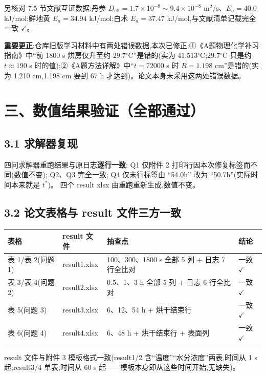 \documentclass[12pt,a4paper]{ctexart}
\newcommand{\ok}{$\checkmark$}
\newcommand{\dg}{\ensuremath{^\circ}}
\begin{document}
另核对 7.5 节文献互证数据:丹参 $D_{\mathrm{eff}}=1.7\times10^{-8}\sim9.4\times10^{-8}$ m$^2$/s、$E_a=40.0$ kJ/mol;鲜地黄 $E_a=34.94$ kJ/mol;白术 $E_a=37.47$ kJ/mol,与文献清单记载完全一致 \ok。

\textbf{重要更正}:仓库旧版学习材料中有两处错误数据,本次已修正:①《A题物理化学补习指南》中``前 1800 s 烘房仅升至约 29.7\dg C''是错的(实为 $41.513\dg$C;$29.7\dg$C 只是约 $t\approx190$ s 时的值);②《A题方法详解》中``$t=72000$ s 时 $R=1.198$ cm''是错的(实为 1.210 cm,1.198 cm 要到 67 h 才达到)。论文本身未采用这两处错误数据。

\section{三、数值结果验证（全部通过）}

\subsection{3.1 求解器复现}

四问求解器重跑结果与原日志\textbf{逐行一致}:
Q1 仅附件 2 打印行因本次修复标签而不同(数值不变);
Q2、Q3 完全一致;
Q4 仅末行标签由 ``54.0h'' 改为 ``50.7h''(实际时间本来就是 $t^*$)。
四个 result xlsx 由重跑重新生成,数值不变。

\subsection{3.2 论文表格与 result 文件三方一致}

\begin{center}
{\begin{tabular}{llll}
\toprule
表格 & result 文件 & 抽查点 & 结论 \\
\midrule
表 1/表 2(问题 1) & result1.xlsx & 100、300、1800 s 全部 5 列 + 日志 7 行全比对 & 一致 \ok \\
表 3/表 4(问题 2) & result2.xlsx & 0.5、1、3 h 全部 5 列 + 日志 6 行全比对 & 一致 \ok \\
表 5(问题 3) & result3.xlsx & 6、12、54 h + 烘干结束行 & 一致 \ok \\
表 6(问题 4) & result4.xlsx & 6、48 h + 烘干结束行 + 表面列 & 一致 \ok \\
\bottomrule
\end{tabular}}
\end{center}

result 文件与附件 3 模板格式一致(result1/2 含``温度''``水分浓度''两表,时间从 1 s 起;result3/4 单表,时间从 60 s 起——模板本身即从这些时间开始,无缺失)。
\end{document}
